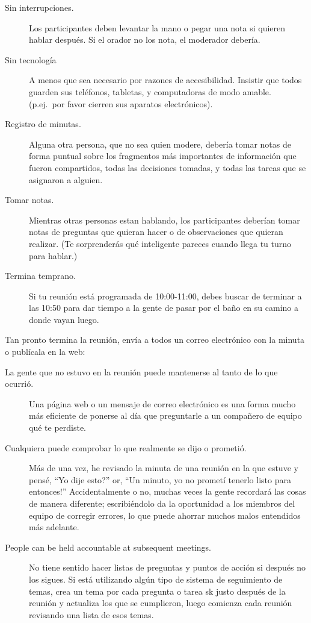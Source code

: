 \begin{description}
\item[Sin interrupciones.]
  Los participantes deben levantar la mano o pegar una nota
  si quieren hablar después.
  Si el orador no los nota,
  el moderador debería.

\item[Sin tecnología]
  A menos que sea necesario por razones de accesibilidad.
  Insistir que todos guarden sus teléfonos, tabletas, y computadoras de modo amable.
  (p.ej.\ por favor cierren sus aparatos electrónicos).

\item[Registro de minutas.]
  Alguna otra persona, que no sea quien modere, debería tomar notas de forma puntual sobre 
  los fragmentos más importantes de información que fueron compartidos,
  todas las decisiones tomadas,
  y todas las tareas que se asignaron a alguien.

\item[Tomar notas.]
  Mientras otras personas estan hablando,
  los participantes deberían tomar notas de preguntas que quieran hacer o de observaciones que quieran realizar.
  (Te sorprenderás qué inteligente pareces cuando llega tu turno para hablar.)

\item[Termina temprano.]
  Si tu reunión está programada de 10:00-11:00,
  debes buscar de terminar a las 10:50 para dar tiempo a la gente de pasar por el baño 
  en su camino a donde vayan luego.

\end{description}

Tan pronto termina la reunión,
envía a todos un correo electrónico con la minuta o publícala en la web:

\begin{description}

\item[La gente que no estuvo en la reunión puede mantenerse al tanto de lo que ocurrió.]
  Una página web o un mensaje de correo electrónico es una forma mucho más eficiente de ponerse al día
  que preguntarle a un compañero de equipo qué te perdiste.

\item[Cualquiera puede comprobar lo que realmente se dijo o prometió.]
  Más de una vez,
  he revisado la minuta de una reunión en la que estuve
  y pensé, ``Yo dije esto?''
  or, ``Un minuto, yo no prometí tenerlo listo para entonces!''
  Accidentalmente o no,
  muchas veces la gente recordará las cosas de manera diferente;
  escribiéndolo da la oportunidad a los miembros del equipo de corregir errores,
  lo que puede ahorrar muchos malos entendidos más adelante.

\item[People can be held accountable at subsequent meetings.]
  No tiene sentido hacer listas de preguntas y puntos de acción
  si después no los sigues.
  Si está utilizando algún tipo de sistema de seguimiento de temas,
  crea un tema por cada pregunta o tarea sk justo después de la reunión
  y actualiza los que se cumplieron,
  luego comienza cada reunión revisando una lista de esos temas.

\end{description}

